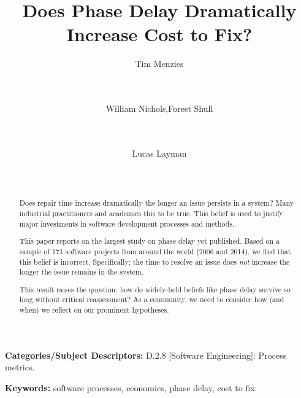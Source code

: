 \documentclass{sig-alternate}
\begin{document}
\title{Does Phase Delay Dramatically Increase Cost to Fix?}
\author{
Tim Menzies \\
       \\
       \\
\and%
William Nichols,Forest Shull \\
        \\
        \\
\and %
Lucas Layman \\
        \\
       \\ 
} 
\maketitle
\begin{abstract}
Does
repair time increase dramatically
the longer an issue persists in a system?
Many industrial practitioners and academics this   to be true.
This   belief is used to justify 
major investments in  software development
 processes and methods.

This
paper reports on the largest study on phase delay yet published.
Based on a sample of 
171 software projects from around the world (2006 and 2014),
 we find that this belief is  
incorrect. Specifically: the    time  to resolve an
issue   does {\em not} increase
the longer the issue remains in the system.    

This result raises the question: how do widely-held beliefs like phase delay survive so long  without  critical reassessment?  As a community, we need to consider how (and when) we reflect on our prominent hypotheses.
\end{abstract}

\vspace{1mm}
\noindent
{\bf Categories/Subject Descriptors:} 
D.2.8 [Software Engineering]: Process metrics.

 

\vspace{1mm}
\noindent
{\bf Keywords:} software processes, economics, phase delay, cost to fix.
\end{document}

